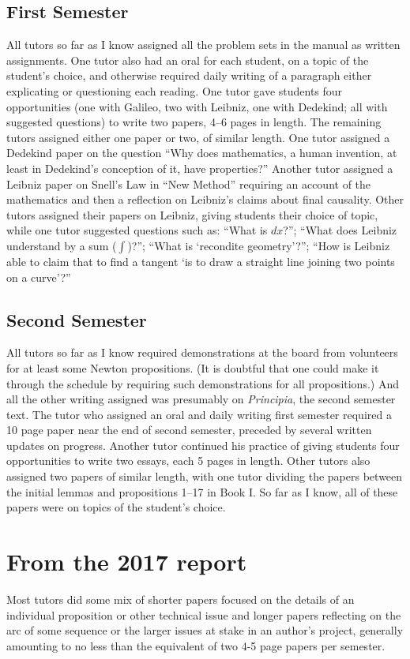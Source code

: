 \documentclass{article}
\begin{document}
	\subsection{First Semester}
	All tutors so far as I know assigned all the problem
	sets in the manual as written assignments. One tutor
	also had an oral for each student, on a topic of the
	student's choice, and otherwise required daily
	writing of a paragraph either explicating or
	questioning each reading. One tutor gave students four
	opportunities (one with Galileo, two with Leibniz,
	one with Dedekind; all with suggested questions) to
	write two papers, 4--6 pages in length. The
	remaining tutors assigned either one paper or two,
	of similar length. One tutor assigned a Dedekind
	paper on the question ``Why does mathematics, a
	human invention, at least in Dedekind's conception
	of it, have properties?'' Another tutor assigned a
	Leibniz paper on Snell's Law in ``New Method''
	requiring an account of the mathematics and then a
	reflection on Leibniz's claims about final
	causality. Other tutors assigned their papers on
	Leibniz, giving students their choice of topic,
	while one tutor suggested questions such as:  
	``What is $dx$?''; ``What does
	Leibniz understand by a sum ($\int$)?''; ``What is
	`recondite geometry'?''; ``How is Leibniz able to claim
	that to find a tangent `is to draw a straight line
	joining two points on a curve'?'' 

	\subsection{Second Semester}
	All tutors so far as I know required demonstrations
	at the board from volunteers for at least some
	Newton propositions. (It is doubtful that one could
	make it through the schedule by requiring such
	demonstrations for all propositions.) And all
	the other writing assigned was presumably on
	\emph{Principia}, the second semester text.
	The tutor who assigned an oral and daily writing
	first semester required a 10 page paper near the end
	of second semester, preceded by several written
	updates on progress. Another tutor continued his
	practice of giving students four opportunities to
	write two essays, each 5 pages in length. Other tutors
	also assigned two papers of similar length, with one tutor
	dividing the papers between the initial lemmas and
	propositions 1--17 in Book I. So far as I know, all
	of these papers were on topics of the student's
	choice. 
	
	
\section{From the 2017 report}
Most tutors did some mix of shorter papers focused on the details of an individual proposition or other technical issue and longer papers reflecting on the arc of some sequence or the larger issues at stake in an author’s project, generally amounting to no less than the equivalent of two 4-5 page papers per semester.
\end{document}
